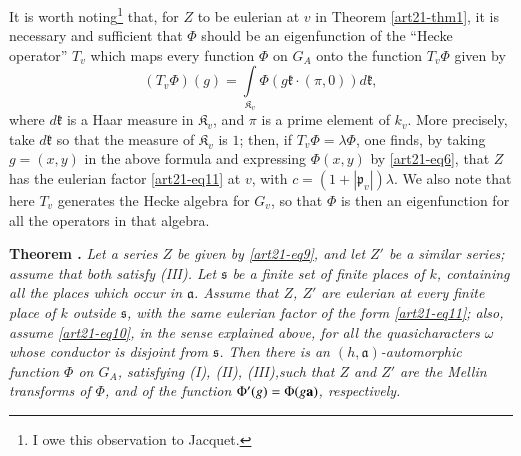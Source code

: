 \smallskip

It is worth noting\footnote[1]{I owe this observation to Jacquet.} that, for $Z$ to be eulerian at $v$ in Theorem \ref{art21-thm1}, it is necessary and sufficient that $\Phi$ should be an eigenfunction of the ``Hecke operator'' $T_{v}$ which maps every function $\Phi$ on $G_{A}$ onto the function $T_{v}\Phi$ given by
$$
(T_{v}\Phi)(g)=\int\limits_{\mathfrak{K}_{v}}\Phi(g\mathfrak{k}\cdot (\pi, 0))d\mathfrak{k},
$$
where $d\mathfrak{k}$ is a Haar measure in $\mathfrak{K}_{v}$, and $\pi$ is a prime element of $k_{v}$. More precisely, take $d\mathfrak{k}$ so that the measure of $\mathfrak{K}_{v}$ is $1$; then, if $T_{v}\Phi=\lambda\Phi$, one finds, by taking $g=(x,y)$ in the above formula and expressing $\Phi(x,y)$ by \eqref{art21-eq6}, that $Z$ has the eulerian factor \eqref{art21-eq11} at $v$, with $c=(1+|\mathfrak{p}_{v}|)\lambda$. We also note that here $T_{v}$ generates the Hecke algebra for $G_{v}$, so that $\Phi$ is then an eigenfunction for all the operators in that algebra.

\medskip
\noindent
{\bf Theorem .\label{art21-thm2}}
{\em Let a series $Z$ be given by \eqref{art21-eq9}, and let $Z'$ be a similar series; assume that both satisfy {\rm(III)}. Let $\mathfrak{s}$ be a finite set of finite places of $k$, containing all the places which occur in $\mathfrak{a}$. Assume that $Z$, $Z'$ are eulerian at every finite place of $k$ outside $\mathfrak{s}$, with the same eulerian factor of the form \eqref{art21-eq11}; also, assume \eqref{art21-eq10}, in the sense explained above, for all the quasicharacters $\omega$ whose conductor is disjoint from $\mathfrak{s}$. Then there is an $(h,\mathfrak{a})$-automorphic function $\Phi$ on $G_{A}$, satisfying {\rm(I), (II), (III),}\pageoriginale such that $Z$ and $Z'$ are the Mellin transforms of $\Phi$, and of the function $\Phi'(g)=\Phi(g\mathbf{a})$, respectively.}
\smallskip

